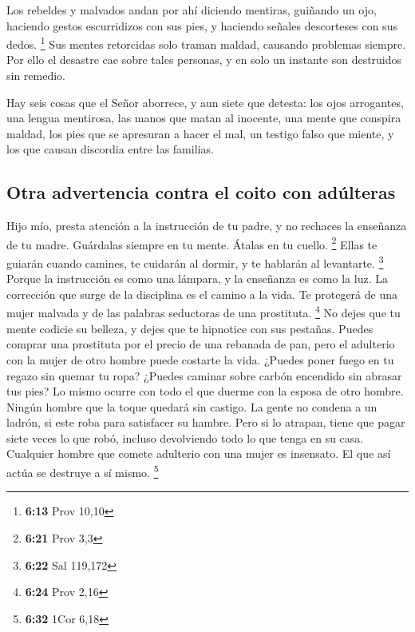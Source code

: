  Los rebeldes y malvados andan por ahí diciendo mentiras,
 guiñando un ojo, haciendo gestos escurridizos con sus
pies, y haciendo señales descorteses con sus dedos. \footnote{\textbf{6:13}
  Prov 10,10}  Sus mentes retorcidas solo traman maldad,
causando problemas siempre.  Por ello el desastre cae sobre
tales personas, y en solo un instante son destruidos sin remedio.

 Hay seis cosas que el Señor aborrece, y aun siete que
detesta:  los ojos arrogantes, una lengua mentirosa, las
manos que matan al inocente,  una mente que conspira
maldad, los pies que se apresuran a hacer el mal,  un
testigo falso que miente, y los que causan discordia entre las familias.

\hypertarget{otra-advertencia-contra-el-coito-con-aduxfalteras}{%
\subsection{Otra advertencia contra el coito con
adúlteras}\label{otra-advertencia-contra-el-coito-con-aduxfalteras}}

 Hijo mío, presta atención a la instrucción de tu padre, y
no rechaces la enseñanza de tu madre.  Guárdalas siempre en
tu mente. Átalas en tu cuello. \footnote{\textbf{6:21} Prov 3,3}
 Ellas te guiarán cuando camines, te cuidarán al dormir, y
te hablarán al levantarte. \footnote{\textbf{6:22} Sal 119,172}
 Porque la instrucción es como una lámpara, y la enseñanza
es como la luz. La corrección que surge de la disciplina es el camino a
la vida.  Te protegerá de una mujer malvada y de las
palabras seductoras de una prostituta. \footnote{\textbf{6:24} Prov 2,16}
 No dejes que tu mente codicie su belleza, y dejes que te
hipnotice con sus pestañas.  Puedes comprar una prostituta
por el precio de una rebanada de pan, pero el adulterio con la mujer de
otro hombre puede costarte la vida.  ¿Puedes poner fuego en
tu regazo sin quemar tu ropa?  ¿Puedes caminar sobre carbón
encendido sin abrasar tus pies?  Lo mismo ocurre con todo
el que duerme con la esposa de otro hombre. Ningún hombre que la toque
quedará sin castigo.  La gente no condena a un ladrón, si
este roba para satisfacer su hambre.  Pero si lo atrapan,
tiene que pagar siete veces lo que robó, incluso devolviendo todo lo que
tenga en su casa.  Cualquier hombre que comete adulterio
con una mujer es insensato. El que así actúa se destruye a sí mismo.
\footnote{\textbf{6:32} 1Cor 6,18}

